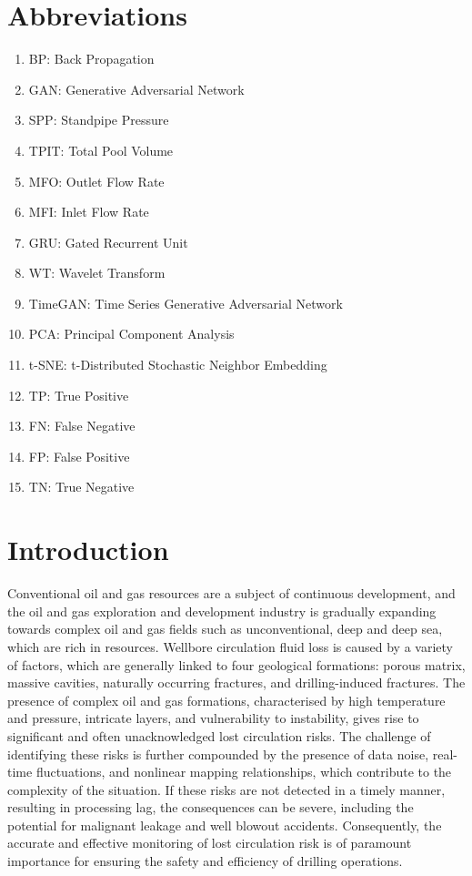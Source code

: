 \documentclass[journal,article,submit,pdftex,moreauthors]{Definitions/mdpi}
\begin{document}
\section*{Abbreviations}
\begin{enumerate}
    \item BP: Back Propagation
    \item GAN: Generative Adversarial Network
    \item SPP: Standpipe Pressure
    \item TPIT: Total Pool Volume
    \item MFO: Outlet Flow Rate
    \item MFI: Inlet Flow Rate
    \item GRU: Gated Recurrent Unit
    \item WT: Wavelet Transform
    \item TimeGAN: Time Series Generative Adversarial Network
    \item PCA: Principal Component Analysis
    \item t-SNE: t-Distributed Stochastic Neighbor Embedding
    \item TP: True Positive
    \item FN: False Negative
    \item FP: False Positive
    \item TN: True Negative
\end{enumerate}
\section{Introduction}

Conventional oil and gas resources are a subject of continuous development, and the oil and gas exploration and development industry is gradually expanding towards complex oil and gas fields such as unconventional, deep and deep sea, which are rich in resources. Wellbore circulation fluid loss is caused by a variety of factors, which are generally linked to four geological formations\cite{ELMOUSALAMI2024212837}: porous matrix, massive cavities, naturally occurring fractures, and drilling-induced fractures\cite{ALBATTAT2022110770}. The presence of complex oil and gas formations, characterised by high temperature and pressure, intricate layers, and vulnerability to instability, gives rise to significant and often unacknowledged lost circulation risks. The challenge of identifying these risks is further compounded by the presence of data noise, real-time fluctuations, and nonlinear mapping relationships\cite{LIU2022162}, which contribute to the complexity of the situation. If these risks are not detected in a timely manner, resulting in processing lag, the consequences can be severe, including the potential for malignant leakage and well blowout accidents. Consequently, the accurate and effective monitoring of lost circulation risk is of paramount importance for ensuring the safety and efficiency of drilling operations.
\end{document}
